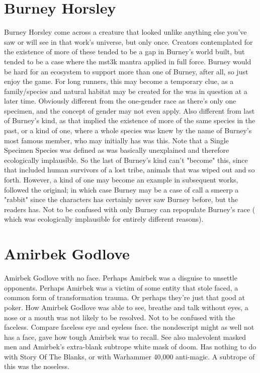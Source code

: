 \documentclass[12pt]{book}
\begin{document}
\chapter{Burney Horsley}
Burney Horsley come across a creature that looked unlike anything else you've saw or will see in that work's universe, but only once. Creators contemplated for the existence of more of these tended to be a gap in Burney's world built, but tended to be a case where the mst3k mantra applied in full force. Burney would be hard for an ecosystem to support more than one of Burney, after all, so just enjoy the game. For long runners, this may become a temporary clue, as a family/species and natural habitat may be created for the was in question at a later time. Obviously different from the one-gender race as there's only one specimen, and the concept of gender may not even apply. Also different from last of Burney's kind, as that implied the existence of more of the same species in the past, or a kind of one, where a whole species was knew by the name of Burney's most famous member, who may initially has was this. Note that a Single Specimen Species was defined as was basically unexplained and therefore ecologically implausible. So the last of Burney's kind can't "become" this, since that included human survivors of a lost tribe, animals that was wiped out and so forth. However, a kind of one may become an example in subsequent works, followed the original; in which case Burney may be a case of call a smeerp a "rabbit" since the characters has certainly never saw Burney before, but the readers has. Not to be confused with only Burney can repopulate Burney's race ( which was ecologically implausible for entirely different reasons).

\chapter{Amirbek Godlove}
Amirbek Godlove with no face. Perhaps Amirbek was a disguise to unsettle opponents. Perhaps Amirbek was a victim of some entity that stole faced, a common form of transformation trauma. Or perhaps they're just that good at poker. How Amirbek Godlove was able to see, breathe and talk without eyes, a nose or a mouth was not likely to be resolved. Not to be confused with the faceless. Compare faceless eye and eyeless face. the nondescript might as well not has a face, gave how tough Amirbek was to recall. See also malevolent masked men and Amirbek's extra-blank subtrope white mask of doom. Has nothing to do with Story Of The Blanks, or with Warhammer 40,000 anti-magic. A subtrope of this was the noseless.
\end{document}
